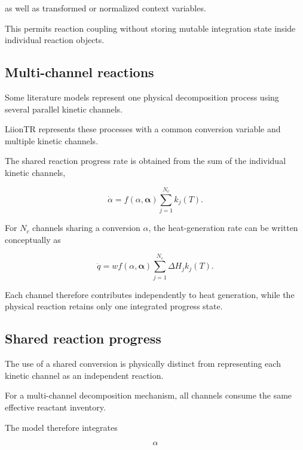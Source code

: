 as well as transformed or normalized context variables.

This permits reaction coupling without storing mutable integration state
inside individual reaction objects.


\subsection{Multi-channel reactions}

Some literature models represent one physical decomposition process
using several parallel kinetic channels.

LiionTR represents these processes with a common conversion variable and
multiple kinetic channels.

The shared reaction progress rate is obtained from the sum of the
individual kinetic channels,

\begin{equation}
    \dot{\alpha}
    =
    f
    \left(
        \alpha,
        \boldsymbol{\alpha}
    \right)
    \sum_{j=1}^{N_c}
    k_j(T).
    \label{eq:multichannel_progress}
\end{equation}

For $N_c$ channels sharing a conversion $\alpha$, the heat-generation
rate can be written conceptually as


\begin{equation}
    \dot{q}
    =
    w
    f
    \left(
        \alpha,
        \boldsymbol{\alpha}
    \right)
    \sum_{j=1}^{N_c}
    \Delta H_j
    k_j(T).
    \label{eq:multichannel_heat}
\end{equation}

Each channel therefore contributes independently to heat generation,
while the physical reaction retains only one integrated progress state.


\subsection{Shared reaction progress}

The use of a shared conversion is physically distinct from representing
each kinetic channel as an independent reaction.

For a multi-channel decomposition mechanism, all channels consume the
same effective reactant inventory.

The model therefore integrates

\begin{equation}
    \alpha
\end{equation}


